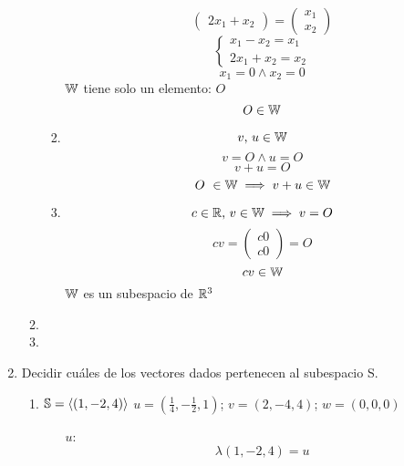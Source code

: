 \documentclass[../practica.root.tex]{subfiles}
\begin{document}
\begin{enumerate}
\begin{enumerate}
\begin{enumerate}
\[\begin{pmatrix}
                                      2x_1 + x_2
                                  \end{pmatrix}
                                  =
                                  \begin{pmatrix}
                                      x_1 \\ x_2
                                  \end{pmatrix}
                              \]
                              \[
                                  \begin{cases}
                                      x_1 - x_2 = x_1 \\
                                      2x_1 + x_2 = x_2
                                  \end{cases}
                              \]
                              \[ x_1 = 0 \land x_2 = 0 \]
                              $\W$ tiene solo un elemento: $O$
                              \[ O \in \W \]
                        \item \[ v\text{, }u \in \W \]
                              \[ v = O \land u = O \]
                              \[ v + u = O \]
                              \[ O \in \W \implies v + u \in \W \]
                        \item \[ c \in \R\text{, }v \in \W \implies v = O \]
                              \[ cv =
                                  \begin{pmatrix}
                                      c0 \\ c0
                                  \end{pmatrix}
                                  = O
                              \]
                              \[ cv \in \W \]
                              $\W$ es un subespacio de $\R^3$
                    \end{enumerate}
              \item
              \item
          \end{enumerate}
    \item Decidir cuáles de los vectores dados pertenecen al subespacio S.
          \begin{enumerate}
              \item $ \S = \langle (1,-2,4) \rangle $ \tabr $u = (\frac{1}{4}, -\frac{1}{2}, 1)$; $v = (2,-4,4)$; $w = (0,0,0)$
                    \begin{itemize}
                        \item[$u$:] \[ \lambda(1,-2,4) = u \]

\end{itemize}
\end{enumerate}
\end{enumerate}
\end{document}
